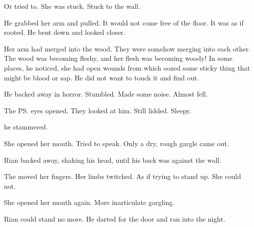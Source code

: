 Or tried to. 
She was stuck. 
Stuck to the wall. 

He grabbed her arm and pulled. 
It would not come free of the floor. 
It was as if rooted. 
He bent down and looked closer. 

Her arm had merged into the wood. 
They were somehow merging into each other. 
The wood was becoming fleshy, and her flesh was becoming woody! 
In some places, he noticed, she had open wounds from which oozed some sticky thing that might be blood or sap. 
He did not want to touch it and find out. 

He backed away in horror. 
Stumbled. 
Made some noise. 
Almost fell. 

The \ps{\sphyle} eyes opened. 
They looked at him. 
Still lidded. 
Sleepy. 

 he stammered. 

She opened her mouth. 
Tried to speak. 
Only a dry, rough gargle came out. 

Rian backed away, shaking his head, until his back was against the wall. 

The \sphyle{} moved her fingers. 
Her limbs twitched. 
As if trying to stand up. 
She could not. 

She opened her mouth again. 
More inarticulate gargling. 

Rian could stand no more. 
He darted for the door and ran into the night. 









